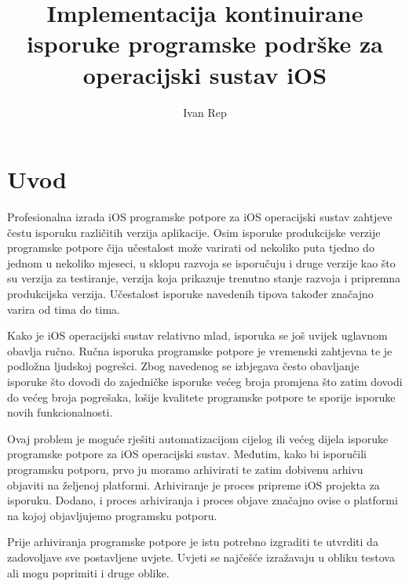 \documentclass[times, utf8, diplomski, numeric]{fer}
\begin{document}

\title{Implementacija kontinuirane isporuke programske podrške za operacijski sustav iOS}

\author{Ivan Rep}

\maketitle

\izvornik

\zahvala{}

\tableofcontents

\chapter{Uvod}

Profesionalna izrada iOS programske potpore za iOS operacijski sustav zahtjeve čestu isporuku različitih verzija aplikacije. Osim isporuke produkcijske verzije programske potpore čija učestalost može varirati od nekoliko puta tjedno do jednom u nekoliko mjeseci, u sklopu razvoja se isporučuju i druge verzije kao što su verzija za testiranje, verzija koja prikazuje trenutno stanje razvoja i pripremna produkcijska verzija. Učestalost isporuke navedenih tipova također značajno varira od tima do tima.

Kako je iOS operacijski sustav relativno mlad, isporuka se još uvijek uglavnom obavlja ručno. Ručna isporuka programske potpore je vremenski zahtjevna te je podložna ljudskoj pogrešci. Zbog navedenog se izbjegava često obavljanje isporuke što dovodi do zajedničke isporuke većeg broja promjena što zatim dovodi do većeg broja pogrešaka, lošije kvalitete programske potpore te sporije isporuke novih funkcionalnosti.

Ovaj problem je moguće rješiti automatizacijom cijelog ili većeg dijela isporuke programske potpore za iOS operacijski sustav. Međutim, kako bi isporučili programsku potporu, prvo ju moramo arhivirati te zatim dobivenu arhivu objaviti na željenoj platformi. Arhiviranje je proces pripreme iOS projekta za isporuku. Dodano, i proces arhiviranja i proces objave značajno ovise o platformi na kojoj objavljujemo programsku potporu.

Prije arhiviranja programske potpore je istu potrebno izgraditi te utvrditi da zadovoljave sve postavljene uvjete. Uvjeti se najčešće izražavaju u obliku testova ali mogu poprimiti i druge oblike.
\end{document}
